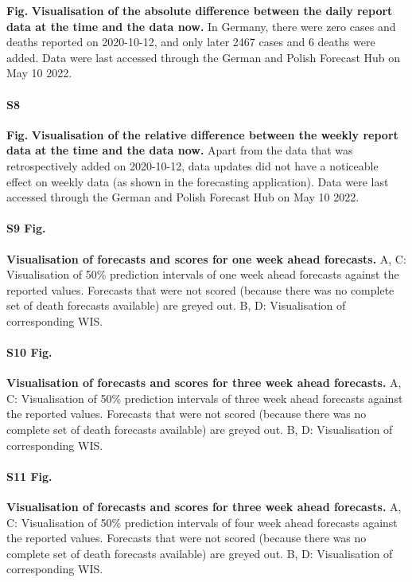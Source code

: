 \documentclass[10pt,letterpaper]{article}
\begin{document}
\textbf{Fig.} \label{fig:daily-truth-update}
\textbf{Visualisation of the absolute difference between the daily report data at the time and the data now.}
In Germany, there were zero cases and deaths reported on 2020-10-12, and
only later 2467 cases and 6 deaths were added. Data were last accessed
through the German and Polish Forecast Hub on May 10 2022.

\paragraph{S8}

\textbf{Fig.} \label{fig:weekly-truth-update}
\textbf{Visualisation of the relative difference between the weekly report data at the time and the data now.}
Apart from the data that was retrospectively added on 2020-10-12, data
updates did not have a noticeable effect on weekly data (as shown in the
forecasting application). Data were last accessed through the German and
Polish Forecast Hub on May 10 2022.

\paragraph{S9 Fig.}
\label{fig:forecasts-and-truth-1}

\textbf{Visualisation of forecasts and scores for one week ahead forecasts.}
A, C: Visualisation of 50\% prediction intervals of one week ahead
forecasts against the reported values. Forecasts that were not scored
(because there was no complete set of death forecasts available) are
greyed out. B, D: Visualisation of corresponding WIS.

\paragraph{S10 Fig.}
\label{fig:forecasts-and-truth-3}

\textbf{Visualisation of forecasts and scores for three week ahead forecasts.}
A, C: Visualisation of 50\% prediction intervals of three week ahead
forecasts against the reported values. Forecasts that were not scored
(because there was no complete set of death forecasts available) are
greyed out. B, D: Visualisation of corresponding WIS.

\paragraph{S11 Fig.}
\label{fig:forecasts-and-truth-4}

\textbf{Visualisation of forecasts and scores for three week ahead forecasts.}
A, C: Visualisation of 50\% prediction intervals of four week ahead
forecasts against the reported values. Forecasts that were not scored
(because there was no complete set of death forecasts available) are
greyed out. B, D: Visualisation of corresponding WIS.
\end{document}
